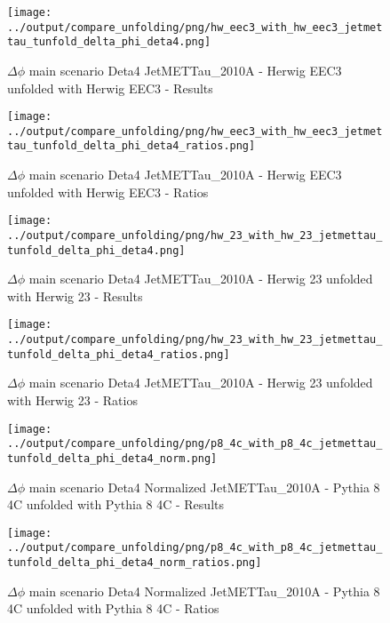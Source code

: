 \documentclass[11pt]{book}
\begin{document}
\begin{figure}[ht]
\centering
\texttt{[image: ../output/compare\_unfolding/png/hw\_eec3\_with\_hw\_eec3\_jetmettau\_tunfold\_delta\_phi\_deta4.png]}
\caption{$\Delta\phi$ main scenario Deta4 JetMETTau\_2010A - Herwig EEC3 unfolded with Herwig EEC3 - Results}
\label{hw_eec3_hw_eec3_jetmettau_tunfold_delta_phi_deta4_a}
\end{figure}

\begin{figure}[ht]
\centering
\texttt{[image: ../output/compare\_unfolding/png/hw\_eec3\_with\_hw\_eec3\_jetmettau\_tunfold\_delta\_phi\_deta4\_ratios.png]}
\caption{$\Delta\phi$ main scenario Deta4 JetMETTau\_2010A - Herwig EEC3 unfolded with Herwig EEC3 - Ratios}
\label{hw_eec3_hw_eec3_jetmettau_tunfold_delta_phi_deta4_b}
\end{figure}

\begin{figure}[ht]
\centering
\texttt{[image: ../output/compare\_unfolding/png/hw\_23\_with\_hw\_23\_jetmettau\_tunfold\_delta\_phi\_deta4.png]}
\caption{$\Delta\phi$ main scenario Deta4 JetMETTau\_2010A - Herwig 23 unfolded with Herwig 23 - Results}
\label{hw_23_hw_23_jetmettau_tunfold_delta_phi_deta4_a}
\end{figure}

\begin{figure}[ht]
\centering
\texttt{[image: ../output/compare\_unfolding/png/hw\_23\_with\_hw\_23\_jetmettau\_tunfold\_delta\_phi\_deta4\_ratios.png]}
\caption{$\Delta\phi$ main scenario Deta4 JetMETTau\_2010A - Herwig 23 unfolded with Herwig 23 - Ratios}
\label{hw_23_hw_23_jetmettau_tunfold_delta_phi_deta4_b}
\end{figure}


\begin{figure}[ht]
\centering
\texttt{[image: ../output/compare\_unfolding/png/p8\_4c\_with\_p8\_4c\_jetmettau\_tunfold\_delta\_phi\_deta4\_norm.png]}
\caption{$\Delta\phi$ main scenario Deta4 Normalized JetMETTau\_2010A - Pythia 8 4C unfolded with Pythia 8 4C - Results}
\label{p8_p8_jetmettau_tunfold_delta_phi_deta4_norm_a}
\end{figure}

\begin{figure}[ht]
\centering
\texttt{[image: ../output/compare\_unfolding/png/p8\_4c\_with\_p8\_4c\_jetmettau\_tunfold\_delta\_phi\_deta4\_norm\_ratios.png]}
\caption{$\Delta\phi$ main scenario Deta4 Normalized JetMETTau\_2010A - Pythia 8 4C unfolded with Pythia 8 4C - Ratios}
\label{p8_p8_jetmettau_tunfold_delta_phi_deta4_norm_b}
\end{figure}
\end{document}
